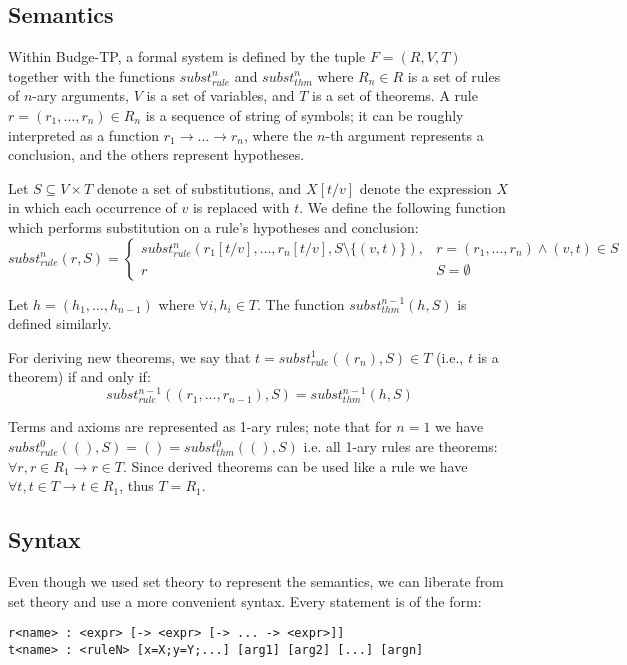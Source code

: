 \documentclass{article}
\begin{document}
\subsection{Semantics}

Within Budge-TP, a formal system is defined by the tuple $F = (R, V, T)$ together with the functions $subst_{rule}^n$ and $subst_{thm}^n$ where $R_n \in R$ is a set of rules of $n$-ary arguments, $V$ is a set of variables, and $T$ is a set of theorems. A rule $r = (r_1, \ldots, r_n) \in R_n$ is a sequence of string of symbols; it can be roughly interpreted as a function $r_1 \to \ldots \to r_n$, where the $n$-th argument represents a conclusion, and the others represent hypotheses.

Let $S \subseteq V \times T$ denote a set of substitutions, and $X[t/v]$ denote the expression $X$ in which each occurrence of $v$ is replaced with $t$. We define the following function which performs substitution on a rule's hypotheses and conclusion:
$$ subst_{rule}^n(r, S) = {
\begin{cases}
subst_{rule}^n(r_1[t/v], \ldots, r_n[t/v], S \setminus \{(v, t) \}), & r = (r_1, \ldots, r_n) \land (v, t) \in S \\
r & S = \emptyset
\end{cases}}
$$

Let $h = (h_1, \ldots, h_{n-1})$ where $\forall i, h_i \in T$. The function $subst_{thm}^{n-1}(h, S)$ is defined similarly.

For deriving new theorems, we say that $t = subst_{rule}^1((r_n), S) \in T$ (i.e., $t$ is a theorem) if and only if:
$$subst_{rule}^{n-1}((r_1, \ldots, r_{n-1}), S) = subst_{thm}^{n-1}(h, S)$$

Terms and axioms are represented as 1-ary rules; note that for $n = 1$ we have $subst_{rule}^0((), S) = () = subst_{thm}^0((), S)$ i.e. all 1-ary rules are theorems: $\forall r, r \in R_1 \to r \in T$. Since derived theorems can be used like a rule we have $\forall t, t \in T \to t \in R_1$, thus $T = R_1$.

\subsection{Syntax}

Even though we used set theory\cite{b6} to represent the semantics, we can liberate from set theory and use a more convenient syntax. Every statement is of the form:

\begin{verbatim}
r<name> : <expr> [-> <expr> [-> ... -> <expr>]]
t<name> : <ruleN> [x=X;y=Y;...] [arg1] [arg2] [...] [argn]
\end{verbatim}
\end{document}
